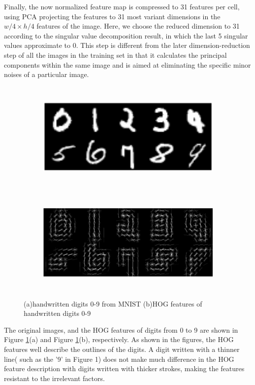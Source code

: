 \documentclass[12pt]{article}
\begin{document}
Finally, the now normalized feature map is compressed to 31 features per cell, using PCA projecting the features to 31 most variant dimensions in the $ w/4 \times h/4 $ features of the image. Here, we choose the reduced dimension to 31 according to the singular value decomposition result, in which the last 5 singular values approximate to 0. This step is different from the later dimension-reduction step of all the images in the training set in that it calculates the principal components within the same image and is aimed at eliminating the specific minor noises of a particular image.
\begin{figure}[h]
\centering
	\begin{subfigure}{.85\textwidth}
		\includegraphics[height = 2.1in]{image.png}		
		\caption{ }
	\end{subfigure}
	\begin{subfigure}{.85\textwidth}
		\includegraphics[height = 2in]{hog.png}	
		\caption{ }
	\end{subfigure}
	\caption{ (a)handwritten digits 0-9 from MNIST (b)HOG features of handwritten digits 0-9}
	\label{fig:hog}
	\end{figure}

The original images, and the HOG features of digits from 0 to 9 are shown in Figure \ref{fig:hog}(a) and Figure \ref{fig:hog}(b), respectively. As shown in the figures, the HOG features well describe the outlines of the digits. A digit written with a thinner line( such as the '9' in Figure 1) does not make much difference in the HOG feature description with digits written with thicker strokes, making the features resistant to the irrelevant factors.
\end{document}
